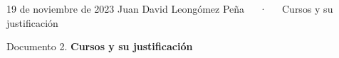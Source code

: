 \documentclass[11pt,a4paper,]{awesome-cv}
\begin{document}
\makecvheader

\makecvfooter
  {19 de noviembre de 2023}
    {Juan David Leongómez Peña~~~·~~~Cursos y su justificación}
  {\thepage}





\vspace{4mm}
\begin{tcolorbox}[enhanced,
        on line, 
        boxsep=4pt, left=0pt,right=0pt,top=0pt,bottom=0pt,
        colframe=white,colback=black]
  
\color{white}
\begin{LARGE}\begin{center}
Documento 2. \textbf{Cursos y su justificación}
\end{center}\end{LARGE}
\end{tcolorbox}
\end{document}
